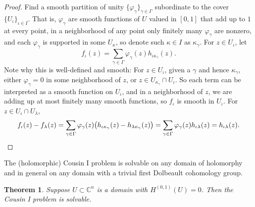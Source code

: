 \documentclass[12pt,openany]{book}
\newcommand{\C}{{\mathbb{C}}}
\theoremstyle{plain}
\newtheorem{thm}{Theorem}[section]
\theoremstyle{remark}
\theoremstyle{definition}
\theoremstyle{exercise}
\theoremstyle{example}
\begin{document}
\begin{proof}
Find a smooth partition of unity $\{ \varphi_\gamma \}_{\gamma \in \Gamma}$
subordinate to
the cover $\{ U_{\iota} \}_{\iota \in I}$.  That is, $\varphi_\gamma$ are
smooth functions of $U$ valued in $[0,1]$ that add up to $1$ at every point,
in a neighborhood of any point only finitely many $\varphi_\gamma$ are
nonzero, and each $\varphi_{\gamma}$ is supported in some $U_\kappa$,
so denote such $\kappa \in I$ as $\kappa_\gamma$.
For $z \in U_\iota$, let
\begin{equation*}
f_\iota(z) = \sum_{\gamma \in \Gamma} \varphi_\gamma(z) h_{\iota \kappa_\gamma}(z) .
\end{equation*}
Note why this is well-defined and smooth:
For $z \in U_\iota$, given a $\gamma$ and hence $\kappa_\gamma$,
either $\varphi_\gamma=0$ in some neighborhood of $z$,
or $z \in U_{\kappa_\gamma} \cap U_\iota$.
So each term can be interpreted as a smooth function on
$U_\iota$, and in a neighborhood of $z$, we are adding up at most
finitely many
smooth functions, so $f_\iota$ is smooth in $U_\iota$.
For $z \in U_\iota \cap U_\lambda$,
\begin{equation*}
f_\iota(z)-f_\lambda(z) =
\sum_{\gamma \in \Gamma} \varphi_\gamma(z)
\bigl( h_{\iota \kappa_\gamma}(z) - h_{\lambda \kappa_\gamma}(z) \bigr)
=
\sum_{\gamma \in \Gamma} \varphi_\gamma(z)
h_{\iota\lambda}(z)
=
h_{\iota\lambda}(z) .
\qedhere
\end{equation*}
\end{proof}

The (holomorphic) Cousin I problem
is solvable on any domain of holomorphy and in general
on any domain with a trivial first Dolbeault cohomology group.

\begin{thm}
Suppose $U \subset \C^n$ is a domain with $H^{(0,1)}(U)=0$.
Then the Cousin I problem is solvable.
\end{thm}
\end{document}
